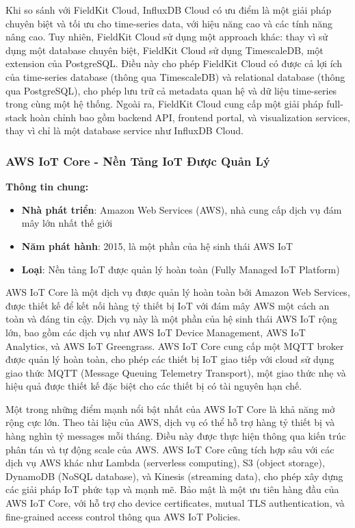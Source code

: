 Khi so sánh với FieldKit Cloud, InfluxDB Cloud có ưu điểm là một giải pháp chuyên biệt và tối ưu cho time-series data, với hiệu năng cao và các tính năng nâng cao. Tuy nhiên, FieldKit Cloud sử dụng một approach khác: thay vì sử dụng một database chuyên biệt, FieldKit Cloud sử dụng TimescaleDB, một extension của PostgreSQL. Điều này cho phép FieldKit Cloud có được cả lợi ích của time-series database (thông qua TimescaleDB) và relational database (thông qua PostgreSQL), cho phép lưu trữ cả metadata quan hệ và dữ liệu time-series trong cùng một hệ thống. Ngoài ra, FieldKit Cloud cung cấp một giải pháp full-stack hoàn chỉnh bao gồm backend API, frontend portal, và visualization services, thay vì chỉ là một database service như InfluxDB Cloud.

\subsubsection{AWS IoT Core - Nền Tảng IoT Được Quản Lý}

\textbf{Thông tin chung:}
\begin{itemize}
    \item \textbf{Nhà phát triển}: Amazon Web Services (AWS), nhà cung cấp dịch vụ đám mây lớn nhất thế giới
    \item \textbf{Năm phát hành}: 2015, là một phần của hệ sinh thái AWS IoT
    \item \textbf{Loại}: Nền tảng IoT được quản lý hoàn toàn (Fully Managed IoT Platform)
\end{itemize}

AWS IoT Core là một dịch vụ được quản lý hoàn toàn bởi Amazon Web Services, được thiết kế để kết nối hàng tỷ thiết bị IoT với đám mây AWS một cách an toàn và đáng tin cậy. Dịch vụ này là một phần của hệ sinh thái AWS IoT rộng lớn, bao gồm các dịch vụ như AWS IoT Device Management, AWS IoT Analytics, và AWS IoT Greengrass. AWS IoT Core cung cấp một MQTT broker được quản lý hoàn toàn, cho phép các thiết bị IoT giao tiếp với cloud sử dụng giao thức MQTT (Message Queuing Telemetry Transport), một giao thức nhẹ và hiệu quả được thiết kế đặc biệt cho các thiết bị có tài nguyên hạn chế.

Một trong những điểm mạnh nổi bật nhất của AWS IoT Core là khả năng mở rộng cực lớn. Theo tài liệu của AWS, dịch vụ có thể hỗ trợ hàng tỷ thiết bị và hàng nghìn tỷ messages mỗi tháng. Điều này được thực hiện thông qua kiến trúc phân tán và tự động scale của AWS. AWS IoT Core cũng tích hợp sâu với các dịch vụ AWS khác như Lambda (serverless computing), S3 (object storage), DynamoDB (NoSQL database), và Kinesis (streaming data), cho phép xây dựng các giải pháp IoT phức tạp và mạnh mẽ. Bảo mật là một ưu tiên hàng đầu của AWS IoT Core, với hỗ trợ cho device certificates, mutual TLS authentication, và fine-grained access control thông qua AWS IoT Policies.

